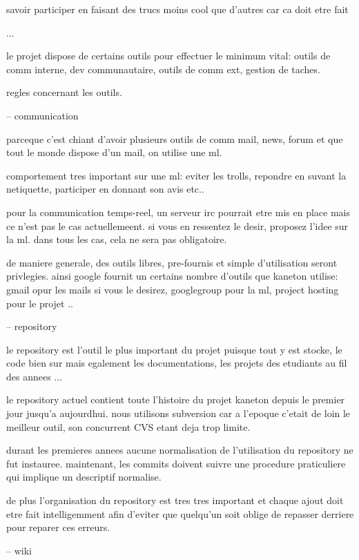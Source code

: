 savoir participer en faisant des trucs moins cool que d'autres car ca
doit etre fait

...

le projet dispose de certains outils pour effectuer le minimum vital:
outils de comm interne, dev communautaire, outils de comm ext, gestion
de taches.

%
%

regles concernant les outils.

-- communication

parceque c'est chiant d'avoir plusieurs outils de comm mail, news, forum
et que tout le monde dispose d'un mail, on utilise une ml.

comportement tres important sur une ml: eviter les trolls, repondre
en suvant la netiquette, participer en donnant son avis etc..

pour la communication temps-reel, un serveur irc pourrait etre mis en
place mais ce n'est pas le cas actuellemeent. si vous en ressentez le
desir, proposez l'idee sur la ml. dans tous les cas, cela ne sera pas
obligatoire.

de maniere generale, des outils libres, pre-fournis et simple d'utilisation
seront privlegies. ainsi google fournit un certains nombre d'outils que
kaneton utilise: gmail opur les mails si vous le desirez, googlegroup pour
la ml, project hosting pour le projet ..

-- repository

le repository est l'outil le plus important du projet puisque tout y
est stocke, le code bien sur mais egalement les documentations, les
projets des etudiants au fil des annees ...

le repository actuel contient toute l'histoire du projet kaneton depuis
le premier jour jusqu'a aujourdhui. nous utilisons subversion car a l'epoque
c'etait de loin le meilleur outil, son concurrent CVS etant deja trop
limite.

durant les premieres annees aucune normalisation de l'utilisation du
repository ne fut instauree. maintenant, les commits doivent suivre une
procedure praticuliere qui implique un descriptif normalise.

de plus l'organisation du repository est tres tres important et chaque ajout
doit etre fait intelligemment afin d'eviter que quelqu'un soit oblige de
repasser derriere pour reparer ces erreurs.

-- wiki

